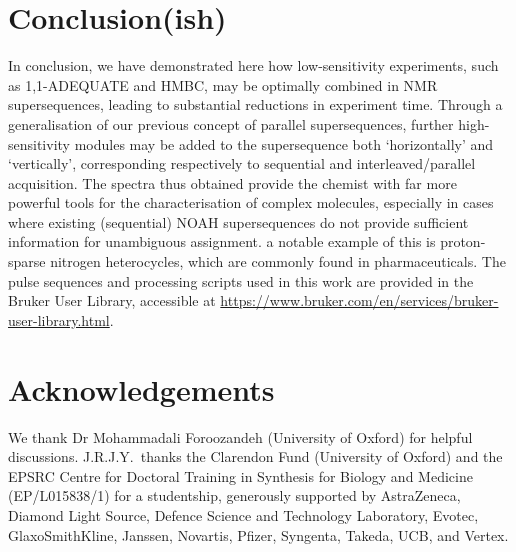 \documentclass[a4paper,12pt]{article}
\newcommand{\meshort}{J.R.J.Y.}
\newcommand{\nitrogen}{\ch{^{15}N}}
\begin{document}
\begin{refsection}
\section{Conclusion(ish)}

In conclusion, we have demonstrated here how low-sensitivity experiments, such as 1,1-ADEQUATE and \nitrogen{} HMBC, may be optimally combined in NMR supersequences, leading to substantial reductions in experiment time.
Through a generalisation of our previous concept of parallel supersequences, further high-sensitivity  modules may be added to the supersequence both `horizontally' and `vertically', corresponding respectively to sequential and interleaved/parallel acquisition.
The spectra thus obtained provide the chemist with far more powerful tools for the characterisation of complex molecules, especially in cases where existing (sequential) NOAH supersequences do not provide sufficient information for unambiguous assignment.
a notable example of this is proton-sparse nitrogen heterocycles, which are commonly found in pharmaceuticals.
The pulse sequences and processing scripts used in this work are provided in the Bruker User Library, accessible at \url{https://www.bruker.com/en/services/bruker-user-library.html}.


\section*{Acknowledgements}

We thank Dr Mohammadali Foroozandeh (University of Oxford) for helpful discussions.
\meshort{}\ thanks the Clarendon Fund (University of Oxford) and the EPSRC Centre for Doctoral Training in Synthesis for Biology and Medicine (EP/L015838/1) for a studentship, generously supported by AstraZeneca, Diamond Light Source, Defence Science and Technology Laboratory, Evotec, GlaxoSmithKline, Janssen, Novartis, Pfizer, Syngenta, Takeda, UCB, and Vertex.

\AtNextBibliography{\small}
\printbibliography{}
\end{refsection}


\end{document}
